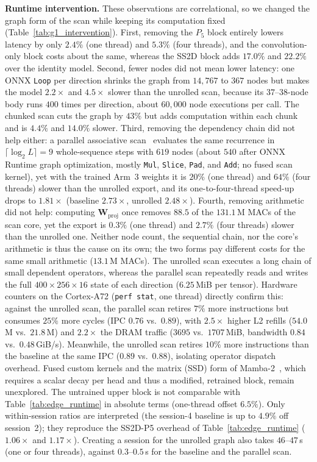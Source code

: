 \textbf{Runtime intervention.} These observations are correlational, so we changed the graph form of the scan while keeping its computation fixed (Table~\ref{tab:g1_intervention}). First, removing the $P_5$ block entirely lowers latency by only $2.4\%$ (one thread) and $5.3\%$ (four threads), and the convolution-only block costs about the same, whereas the SS2D block adds $17.0\%$ and $22.2\%$ over the identity model. Second, fewer nodes did not mean lower latency: one ONNX \texttt{Loop} per direction shrinks the graph from $14{,}767$ to $367$ nodes but makes the model $2.2\times$ and $4.5\times$ slower than the unrolled scan, because its $37$--$38$-node body runs $400$ times per direction, about $60{,}000$ node executions per call. The chunked scan cuts the graph by $43\%$ but adds computation within each chunk and is $4.4\%$ and $14.0\%$ slower. Third, removing the dependency chain did not help either: a parallel associative scan~\cite{blelloch1990prefix} evaluates the same recurrence in $\lceil \log_2 L \rceil = 9$ whole-sequence steps with $619$ nodes (about $540$ after ONNX Runtime graph optimization, mostly \texttt{Mul}, \texttt{Slice}, \texttt{Pad}, and \texttt{Add}; no fused scan kernel), yet with the trained Arm~3 weights it is $20\%$ (one thread) and $64\%$ (four threads) slower than the unrolled export, and its one-to-four-thread speed-up drops to $1.81\times$ (baseline $2.73\times$, unrolled $2.48\times$). Fourth, removing arithmetic did not help: computing $\mathbf{W}_{\text{proj}}$ once removes $88.5$ of the $131.1$\,M MACs of the scan core, yet the export is $0.3\%$ (one thread) and $2.7\%$ (four threads) slower than the unrolled one. Neither node count, the sequential chain, nor the core's arithmetic is thus the cause on its own; the two forms pay different costs for the same small arithmetic ($13.1$\,M MACs). The unrolled scan executes a long chain of small dependent operators, whereas the parallel scan repeatedly reads and writes the full $400 \times 256 \times 16$ state of each direction ($6.25$\,MiB per tensor). Hardware counters on the Cortex-A72 (\texttt{perf stat}, one thread) directly confirm this: against the unrolled scan, the parallel scan retires $7\%$ more instructions but consumes $25\%$ more cycles (IPC $0.76$ vs.\ $0.89$), with $2.5\times$ higher L2 refills ($54.0$\,M vs.\ $21.8$\,M) and $2.2\times$ the DRAM traffic ($3695$ vs.\ $1707$\,MiB, bandwidth $0.84$ vs.\ $0.48$\,GiB/s). Meanwhile, the unrolled scan retires $10\%$ more instructions than the baseline at the same IPC ($0.89$ vs.\ $0.88$), isolating operator dispatch overhead. Fused custom kernels and the matrix (SSD) form of Mamba-2~\cite{dao2024mamba2}, which requires a scalar decay per head and thus a modified, retrained block, remain unexplored. The untrained upper block is not comparable with Table~\ref{tab:edge_runtime} in absolute terms (one-thread offset $6.5\%$). Only within-session ratios are interpreted (the session-4 baseline is up to $4.9\%$ off session~2); they reproduce the SS2D-P5 overhead of Table~\ref{tab:edge_runtime} ($1.06\times$ and $1.17\times$). Creating a session for the unrolled graph also takes $46$--$47$\,s (one or four threads), against $0.3$--$0.5$\,s for the baseline and the parallel scan.

